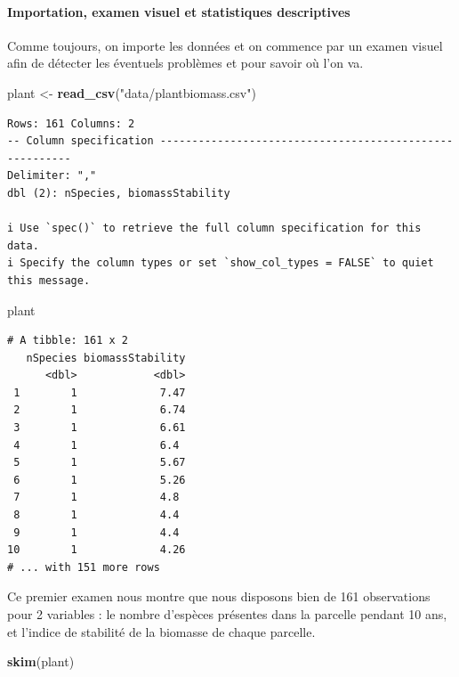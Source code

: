 \documentclass[
  a4paper,
]{article}
\newenvironment{Shaded}{\begin{snugshade}}{\end{snugshade}}
\newcommand{\KeywordTok}[1]{\textcolor[rgb]{0.12,0.11,0.11}{\textbf{#1}}}
\newcommand{\NormalTok}[1]{\textcolor[rgb]{0.12,0.11,0.11}{#1}}
\newcommand{\StringTok}[1]{\textcolor[rgb]{0.75,0.01,0.01}{#1}}
\begin{document}
\hypertarget{importation-examen-visuel-et-statistiques-descriptives}{%
\paragraph{Importation, examen visuel et statistiques descriptives}\label{importation-examen-visuel-et-statistiques-descriptives}}

Comme toujours, on importe les données et on commence par un examen visuel afin de détecter les éventuels problèmes et pour savoir où l'on va.

\begin{Shaded}
\begin{Highlighting}[]
\NormalTok{plant <-}\StringTok{ }\KeywordTok{read_csv}\NormalTok{(}\StringTok{"data/plantbiomass.csv"}\NormalTok{)}
\end{Highlighting}
\end{Shaded}

\begin{verbatim}
Rows: 161 Columns: 2
-- Column specification --------------------------------------------------------
Delimiter: ","
dbl (2): nSpecies, biomassStability

i Use `spec()` to retrieve the full column specification for this data.
i Specify the column types or set `show_col_types = FALSE` to quiet this message.
\end{verbatim}

\begin{Shaded}
\begin{Highlighting}[]
\NormalTok{plant}
\end{Highlighting}
\end{Shaded}

\begin{verbatim}
# A tibble: 161 x 2
   nSpecies biomassStability
      <dbl>            <dbl>
 1        1             7.47
 2        1             6.74
 3        1             6.61
 4        1             6.4 
 5        1             5.67
 6        1             5.26
 7        1             4.8 
 8        1             4.4 
 9        1             4.4 
10        1             4.26
# ... with 151 more rows
\end{verbatim}

Ce premier examen nous montre que nous disposons bien de 161 observations pour 2 variables : le nombre d'espèces présentes dans la parcelle pendant 10 ans, et l'indice de stabilité de la biomasse de chaque parcelle.

\begin{Shaded}
\begin{Highlighting}[]
\KeywordTok{skim}\NormalTok{(plant)}
\end{Highlighting}
\end{Shaded}
\end{document}
